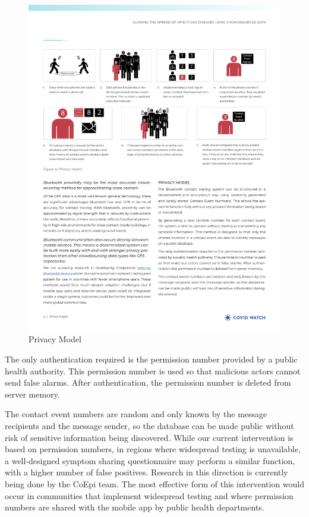 \documentclass[11pt]{article}
\begin{document}
\begin{figure}[ht]
\centering
\includegraphics[width=\textwidth]{figs/fig3.pdf}
\caption{Privacy Model}
\label{privacymodel}
\end{figure}




The only authentication required is the permission number provided by a public health authority. This permission number is used so that malicious actors cannot send false alarms. After authentication, the permission number is deleted from server memory.

The contact event numbers are random and only known by the message recipients and the message sender, so the database can be made public without risk of sensitive information being discovered. 
While our current intervention is based on permission numbers, in regions where widespread testing is unavailable, a well-designed symptom sharing questionnaire may perform a similar function, with a higher number of false positives. Research in this direction is currently being done by the CoEpi team. 
The most effective form of this intervention would occur in communities that implement widespread testing and where permission numbers are shared with the mobile app by public health departments. 
\end{document}
